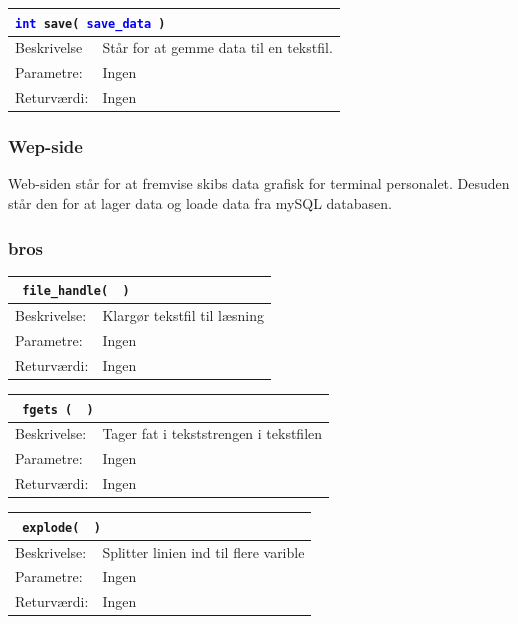 \begin{table}[H]
\begin{tabular}{l p{12.5cm}}
\multicolumn{2}{l}{\texttt{\textcolor{blue}{int} save( \textcolor{blue}{save\_data} )}} \\
\hline
Beskrivelse & Står for at gemme data til en tekstfil. \\
Parametre: & Ingen\\
Returværdi:& Ingen\\
\end{tabular}
\end{table}

\subsubsection{Wep-side}
Web-siden står for at fremvise skibs data grafisk for terminal personalet. Desuden står den for at lager data og loade data fra mySQL databasen.\\

\subsubsection{bros}

\begin{table}[H]
\begin{tabular}{l p{12.5cm}}
\multicolumn{2}{l}{\texttt{\textcolor{blue}{} file\_handle( \textcolor{blue}{} )}} \\
\hline
Beskrivelse:&Klargør tekstfil til læsning\\
Parametre:& Ingen\\
Returværdi:& Ingen\\
\end{tabular}
\end{table}

\begin{table}[H]
\begin{tabular}{l p{12.5cm}}
\multicolumn{2}{l}{\texttt{\textcolor{blue}{} fgets ( \textcolor{blue}{} )}} \\
\hline
Beskrivelse:&Tager fat i tekststrengen i tekstfilen\\
Parametre:& Ingen\\
Returværdi:& Ingen\\
\end{tabular}
\end{table}

\begin{table}[H]
\begin{tabular}{l p{12.5cm}}
\multicolumn{2}{l}{\texttt{\textcolor{blue}{} explode( \textcolor{blue}{} )}} \\
\hline
Beskrivelse: &Splitter linien ind til flere varible\\
Parametre: & Ingen\\
Returværdi: & Ingen\\
\end{tabular}
\end{table}

